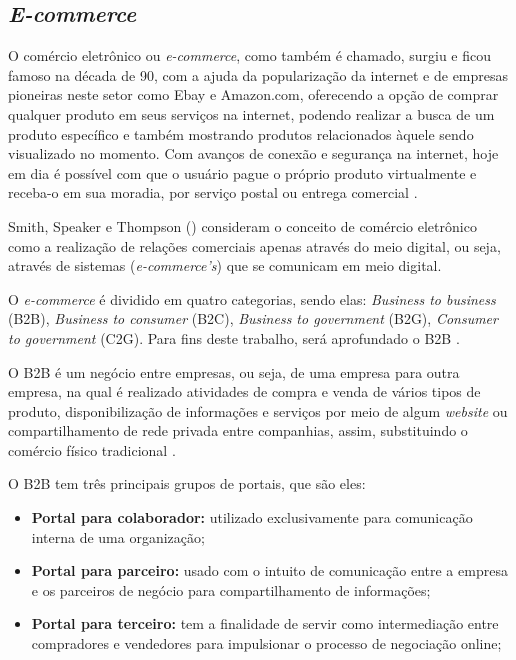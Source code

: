 \subsection{\textit{E-commerce}}

O comércio eletrônico ou \textit{e-commerce}, como também é chamado, surgiu e ficou famoso na década de 90, com a ajuda da popularização da internet e de empresas pioneiras neste setor como Ebay e Amazon.com, oferecendo a opção de comprar qualquer produto em seus serviços na internet, podendo realizar a busca de um produto específico e também mostrando produtos relacionados àquele sendo visualizado no momento. Com avanços de conexão e segurança na internet, hoje em dia é possível com que o usuário pague o próprio produto virtualmente e receba-o em sua moradia, por serviço postal ou entrega comercial \cite{Nakamura:2011}.

Smith, Speaker e Thompson (\citeyear{smith2000mais}) consideram o conceito de comércio eletrônico como a realização de relações comerciais apenas através do meio digital, ou seja, através de sistemas (\textit{e-commerce's}) que se comunicam em meio digital.

O \textit{e-commerce} é dividido em quatro categorias, sendo elas: \textit{Business to business} (B2B), \textit{Business to consumer} (B2C), \textit{Business to government} (B2G), \textit{Consumer to government} (C2G). Para fins deste trabalho, será aprofundado o B2B \cite{Nakamura:2011}.

O B2B é um negócio entre empresas, ou seja, de uma empresa para outra empresa, na qual é realizado atividades de compra e venda de vários tipos de produto, disponibilização de informações e serviços por meio de algum \textit{website} ou compartilhamento de rede privada entre companhias, assim, substituindo o comércio físico tradicional \cite{Nakamura:2011}.

O B2B tem três principais grupos de portais, que são eles:
\begin{itemize}
    \item \textbf{Portal para colaborador:} utilizado exclusivamente para comunicação interna de uma organização;
    
    \item \textbf{Portal para parceiro:} usado com o intuito de comunicação entre a empresa e os parceiros de negócio para compartilhamento de informações;
    
    \item \textbf{Portal para terceiro:} tem a finalidade de servir como intermediação entre compradores e vendedores para impulsionar o processo de negociação online;
    
\end{itemize}

